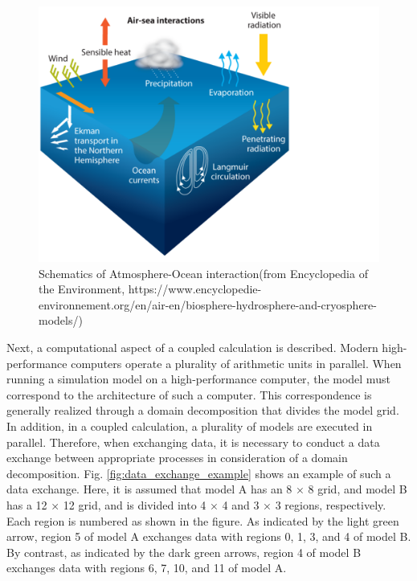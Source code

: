 \documentclass[11pt,a4paper]{report}
\newcommand{\figref}[1]{Fig. \ref{#1}}
\begin{document}
\begin{figure}[H]
\begin{center}
\includegraphics[bb = 0 0 600 550, scale=0.45, clip]{figs/ao_interaction.pdf}
\caption{Schematics of Atmosphere-Ocean interaction(from Encyclopedia of the Environment, https://www.encyclopedie-environnement.org/en/air-en/biosphere-hydrosphere-and-cryosphere-models/)}
\label{fig:ao_interaction}
\end{center}
\end{figure}

Next, a computational aspect of a coupled calculation is described.
Modern high-performance computers operate a plurality of arithmetic units in parallel.
When running a simulation model on a high-performance computer, the model must correspond to the architecture of such a computer.
This correspondence is generally realized through a domain decomposition that divides the model grid.
In addition, in a coupled calculation, a plurality of models are executed in parallel.
Therefore, when exchanging data, it is necessary to conduct a data exchange between appropriate processes in consideration of a domain decomposition.
 \figref{fig:data_exchange_example} shows an example of such a data exchange.
Here, it is assumed that model A has an 8 × 8 grid, and model B has a 12 × 12 grid, and is divided into 4 × 4 and 3 × 3 regions, respectively.
Each region is numbered as shown in the figure.
As indicated by the light green arrow, region 5 of model A exchanges data with regions 0, 1, 3, and 4 of model B.
By contrast, as indicated by the dark green arrows, region 4 of model B exchanges data with regions 6, 7, 10, and 11 of model A.
\end{document}
